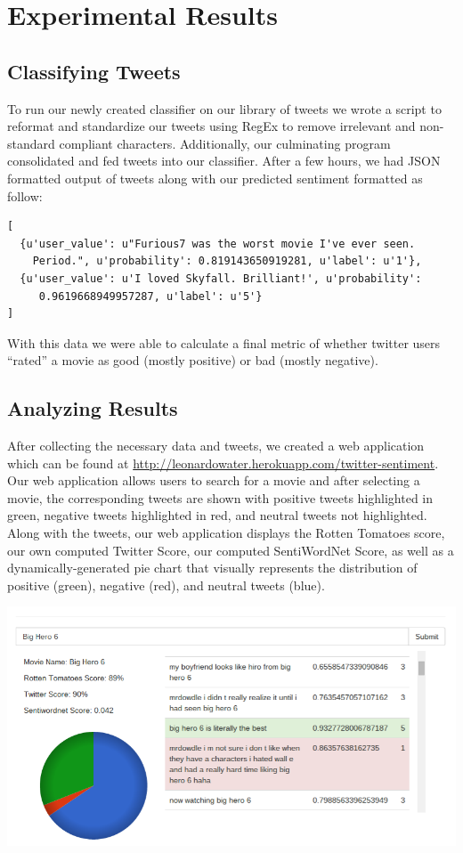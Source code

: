 \documentclass[12pt]{article}
\begin{document}
\section{Experimental Results}\label{S:2}
\subsection{Classifying Tweets}\label{S:3}
To run our newly created classifier on our library of tweets we wrote a script to reformat and standardize our tweets using RegEx to remove irrelevant and non-standard compliant characters. Additionally, our culminating program consolidated and fed tweets into our classifier. After a few hours, we had JSON formatted output of tweets along with our predicted sentiment formatted as follow: 
\begin{verbatim}
[
  {u'user_value': u"Furious7 was the worst movie I've ever seen. 
  	Period.", u'probability': 0.819143650919281, u'label': u'1'}, 
  {u'user_value': u'I loved Skyfall. Brilliant!', u'probability':
  	 0.9619668949957287, u'label': u'5'}
]
\end{verbatim}
With this data we were able to calculate a final metric of whether twitter users “rated” a movie as good (mostly positive) or bad (mostly negative).
\subsection{Analyzing Results}\label{S:3}
After collecting the necessary data and tweets, we created a web application which can be found at 
\url{http://leonardowater.herokuapp.com/twitter-sentiment}. 
Our web application allows users to search for a movie and after selecting a movie, the corresponding tweets are shown with positive tweets highlighted in green, negative tweets highlighted in red, and neutral tweets not highlighted. Along with the tweets, our web application displays the Rotten Tomatoes score, our own computed Twitter Score, our computed SentiWordNet Score, as well as a dynamically-generated pie chart that visually represents the distribution of positive (green), negative (red), and neutral tweets (blue).

\includegraphics[width=\textwidth]{app}
\end{document}
